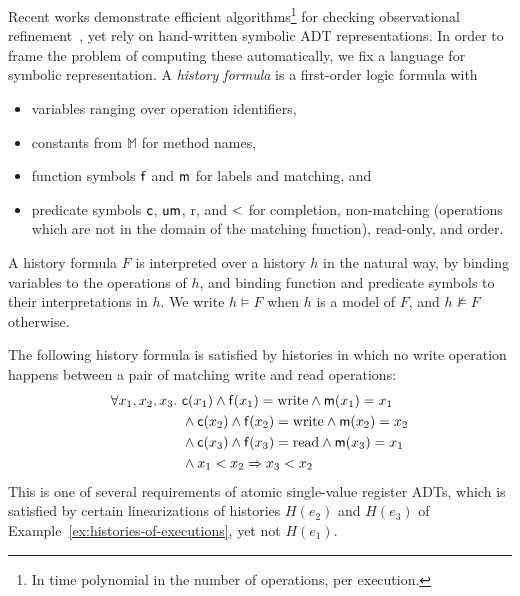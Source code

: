 Recent works demonstrate efficient algorithms\footnote{In time polynomial in
the number of operations, per execution.} for checking observational
refinement~\cite{conf/popl/BouajjaniEEH15, conf/pldi/EmmiEH15}, yet rely on
hand-written symbolic ADT representations. In order to frame the problem of
computing these automatically, we fix a language for symbolic representation. A
\emph{history formula} is a first-order logic formula with
\begin{itemize}

  \item variables ranging over operation identifiers,

  \item constants from $\mathbb{M}$ for method names,

  \item function symbols ${\sf f}$ and ${\sf m}$ for labels and matching, and

  \item predicate symbols ${\sf c}$, ${\sf um}$, {\sf r}, and ${\sf <}$ for completion,
  non-matching (operations which are not in the domain of the matching function), read-only, and order.

\end{itemize}
A history formula $F$ is interpreted over a history $h$ in the natural way, by
binding variables to the operations of $h$, and binding function and predicate
symbols to their interpretations in $h$. We write $h \models F$ when $h$ is a
model of $F$, and $h \not\models F$ otherwise.

\begin{example}

  The following history formula is satisfied by histories in which no write
  operation happens between a pair of matching write and read operations:
  \begin{align*}
    \forall x_1, x_2, x_3.\ 
    & {\sf c}(x_1) \land {\sf f}(x_1) = \mathrm{write} \land {\sf m}(x_1) = x_1 \\
    & \land {\sf c}(x_2) \land {\sf f}(x_2) = \mathrm{write} \land {\sf m}(x_2) = x_2 \\
    & \land {\sf c}(x_3) \land {\sf f}(x_3) = \mathrm{read} \land {\sf m}(x_3) = x_1 \\
    & \land x_1 < x_2 
      \implies x_3 < x_2
  \end{align*}
  This is one of several requirements of atomic single-value register ADTs,
  which is satisfied by certain linearizations of histories $H(e_2)$ and
  $H(e_3)$ of Example~\ref{ex:histories-of-executions}, yet not $H(e_1)$.

\end{example}

